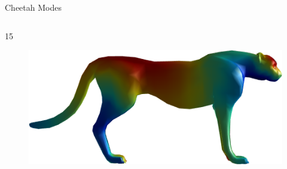 \documentclass{beamer}
\begin{document}
\begin{frame}{Cheetah Modes}
\begin{columns}
\begin{column}[T]{5cm}
\begin{figure}[t]
\end{figure}
15
\begin{figure}[t]
    \includegraphics[width=\textwidth]{Harmonics/CheetahModes/15.png}
\end{figure}
\end{column}
\end{columns}

\end{frame}
\end{document}
